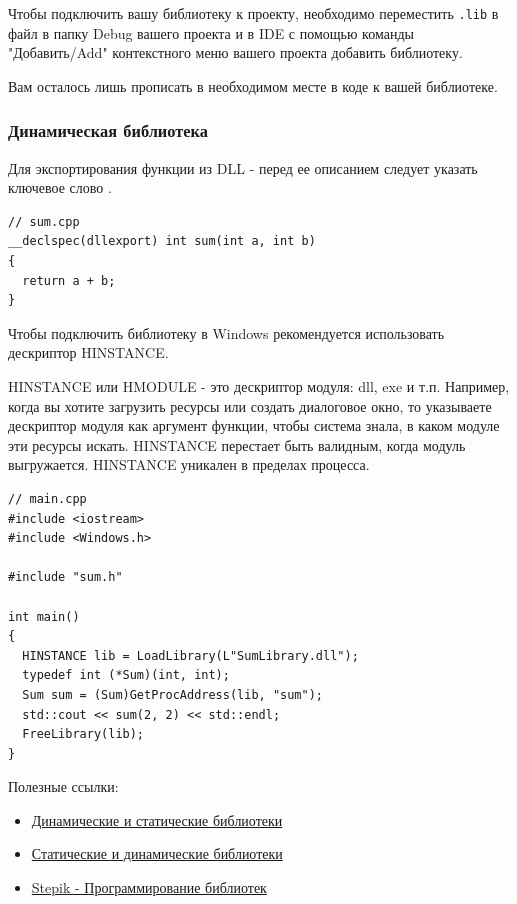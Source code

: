 Чтобы подключить вашу библиотеку к проекту, необходимо переместить \texttt{.lib} в файл в папку Debug вашего проекта и в IDE с помощью команды "Добавить/Add" контекстного меню вашего проекта добавить библиотеку.

Вам осталось лишь прописать в необходимом месте в коде  к вашей библиотеке.

\subsubsection*{Динамическая библиотека}

Для экспортирования функции из DLL - перед ее описанием следует указать ключевое слово .

\begin{verbatim}
// sum.cpp
__declspec(dllexport) int sum(int a, int b)
{
  return a + b;
}
\end{verbatim}

Чтобы подключить библиотеку в Windows рекомендуется использовать дескриптор \break HINSTANCE.

HINSTANCE или HMODULE - это дескриптор модуля: dll, exe и т.п. Например, когда вы хотите загрузить ресурсы или создать диалоговое окно, то указываете дескриптор модуля как аргумент функции, чтобы система знала, в каком модуле эти ресурсы искать. HINSTANCE перестает быть валидным, когда модуль выгружается. HINSTANCE уникален в пределах процесса.

\begin{verbatim}
// main.cpp
#include <iostream>
#include <Windows.h>

#include "sum.h"

int main()
{
  HINSTANCE lib = LoadLibrary(L"SumLibrary.dll");
  typedef int (*Sum)(int, int);
  Sum sum = (Sum)GetProcAddress(lib, "sum");
  std::cout << sum(2, 2) << std::endl;
  FreeLibrary(lib);
}
\end{verbatim}

Полезные ссылки:
\begin{itemize}
    \item \href{https://cpp-kt.github.io/cpp-notes/10_libraries.html}   {Динамические и статические библиотеки}
    \item \href{https://ravesli.com/staticheskie-i-dinamicheskie-biblioteki/}{Статические и динамические библиотеки}
    \item \href{https://stepik.org/lesson/770593?unit=773034}{Stepik -  Программирование библиотек}
\end{itemize}

